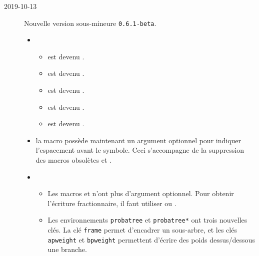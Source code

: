 \documentclass[12pt,a4paper]{article}
\begin{document}
\begin{description}

    \medskip
    \item[2019-10-13] Nouvelle version sous-mineure \verb+0.6.1-beta+.
    
    \begin{itemize}[itemsep=.5em]
        \item {}
        \begin{itemize}[itemsep=.5em]
            \item {} est devenu .
    
            \item {} est devenu .
    
            \item {} est devenu .
    
            \item {} est devenu .
    
            \item {} est devenu .
        \end{itemize}
    
    
    
    
        \item {}
    	      la macro  possède maintenant un argument optionnel pour indiquer l'espacement avant le symbole.
              Ceci s'accompagne de la suppression des macros obsolètes  et .
    
    
    
    
        \item {}
        \begin{itemize}[itemsep=.5em]
            \item Les macros  et  n'ont plus d'argument optionnel. Pour obtenir l'écriture fractionnaire, il faut utiliser  ou .
    
            \item Les environnements \verb+probatree+ et \verb+probatree*+ ont trois nouvelles clés.
                  La clé \verb+frame+ permet d'encadrer un sous-arbre, et les clés \verb+apweight+ et \verb+bpweight+ permettent d'écrire des poids dessus/dessous une branche.
        \end{itemize}
    \end{itemize}


\end{description}
\end{document}
